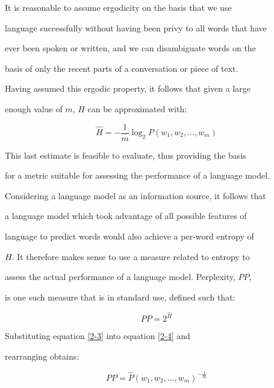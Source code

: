 It is reasonable to assume ergodicity on the basis that we use


language successfully without having been privy to all words that have


ever been spoken or written, and we can disambiguate words on the


basis of only the recent parts of a conversation or piece of text.





Having assumed this ergodic property, it follows that given a large


enough value of $m$, $H$ can be approximated with:


\begin{equation}\label{2-3}


\hat{H} = - \frac{1}{m} \log_2 P(w_1, w_2, \ldots, w_m)


\end{equation}


This last estimate is feasible to evaluate, thus providing the basis


for a metric suitable for assessing the performance of a language model.





Considering a language model as an information source, it follows that


a language model which took advantage of all possible features of


language to predict words would also achieve a per-word entropy of


$H$. It therefore makes sense to use a measure related to entropy to


assess the actual performance of a language model. Perplexity, $PP$,


is one such measure that is in standard use, defined such that:


\begin{equation}\label{2-4}


PP = 2^{\hat{H}}


\end{equation}


Substituting equation \ref{2-3} into equation \ref{2-4} and


rearranging obtains:


\begin{equation}


PP = \hat{P}(w_1, w_2, \ldots, w_m)^{-\frac{1}{m}}\label{pp_sum_eqn}


\end{equation}


